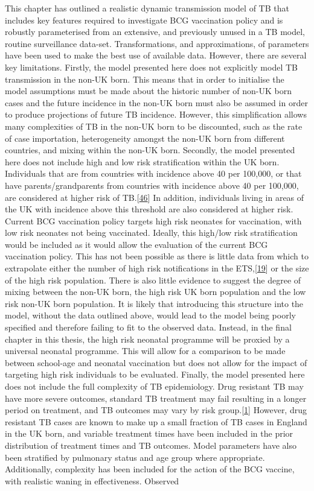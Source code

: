 \documentclass[11pt,twoside]{bristolthesis}
\begin{document}
  This chapter has outlined a realistic dynamic transmission model of TB that includes key features required to investigate BCG vaccination policy and is robustly parameterised from an extensive, and previously unused in a TB model, routine surveillance data-set. Transformations, and approximations, of parameters have been used to make the best use of available data. However, there are several key limitations. Firstly, the model presented here does not explicitly model TB transmission in the non-UK born. This means that in order to initialise the model assumptions must be made about the historic number of non-UK born cases and the future incidence in the non-UK born must also be assumed in order to produce projections of future TB incidence. However, this simplification allows many complexities of TB in the non-UK born to be discounted, such as the rate of case importation, heterogeneity amongst the non-UK born from different countries, and mixing within the non-UK born. Secondly, the model presented here does not include high and low risk stratification within the UK born. Individuals that are from countries with incidence above 40 per 100,000, or that have parents/grandparents from countries with incidence above 40 per 100,000, are considered at higher risk of TB.{[}\protect\hyperlink{ref-PublicHealthEngland2011a}{46}{]} In addition, individuals living in areas of the UK with incidence above this threshold are also considered at higher risk. Current BCG vaccination policy targets high risk neonates for vaccination, with low risk neonates not being vaccinated. Ideally, this high/low risk stratification would be included as it would allow the evaluation of the current BCG vaccination policy. This has not been possible as there is little data from which to extrapolate either the number of high risk notifications in the ETS,{[}\protect\hyperlink{ref-PHE2018}{19}{]} or the size of the high risk population. There is also little evidence to suggest the degree of mixing between the non-UK born, the high risk UK born population and the low risk non-UK born population. It is likely that introducing this structure into the model, without the data outlined above, would lead to the model being poorly specified and therefore failing to fit to the observed data. Instead, in the final chapter in this thesis, the high risk neonatal programme will be proxied by a universal neonatal programme. This will allow for a comparison to be made between school-age and neonatal vaccination but does not allow for the impact of targeting high risk individuals to be evaluated. Finally, the model presented here does not include the full complexity of TB epidemiology. Drug resistant TB may have more severe outcomes, standard TB treatment may fail resulting in a longer period on treatment, and TB outcomes may vary by risk group.{[}\protect\hyperlink{ref-PHE2017}{1}{]} However, drug resistant TB cases are known to make up a small fraction of TB cases in England in the UK born, and variable treatment times have been included in the prior distribution of treatment times and TB outcomes. Model parameters have also been stratified by pulmonary status and age group where appropriate. Additionally, complexity has been included for the action of the BCG vaccine, with realistic waning in effectiveness. Observed 
\end{document}
